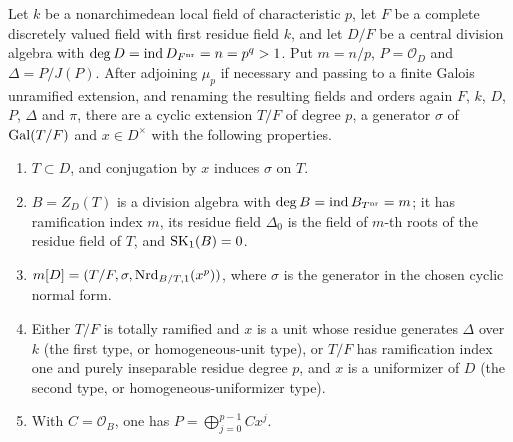 \begin{lemma}\label{lem:second-two-cyclic-cover}
Let $k$ be a nonarchimedean local field of characteristic $p$, let $F$ be a complete discretely valued field with first residue field $k$, and let $D/F$ be a central division algebra with $\deg D=\operatorname{ind} D_{F^{\mathrm{nr}}}=n=p^q>1$.
Put $m=n/p$, $P=\mathcal O_D$ and $\Delta=P/J(P)$.
After adjoining $\mu_p$ if necessary and passing to a finite Galois unramified extension, and renaming the resulting fields and orders again $F$, $k$, $D$, $P$, $\Delta$ and $\pi$, there are a cyclic extension $T/F$ of degree $p$, a generator $\sigma$ of $\operatorname{Gal}(T/F)$ and $x\in D^\times$ with the following properties.
\begin{enumerate}
\item $T\subset D$, and conjugation by $x$ induces $\sigma$ on $T$.
\item $B=Z_D(T)$ is a division algebra with $\deg B=\operatorname{ind} B_{T^{\mathrm{nr}}}=m$; it has ramification index $m$, its residue field $\Delta_0$ is the field of $m$-th roots of the residue field of $T$, and $\operatorname{SK}_1(B)=0$.
\item $m[D]=(T/F,\sigma,\operatorname{Nrd}_{B/T,1}(x^p))$, where $\sigma$ is the generator in the chosen cyclic normal form.
\item Either $T/F$ is totally ramified and $x$ is a unit whose residue generates $\Delta$ over $k$ \textup{(}the first type, or homogeneous-unit type\textup{)}, or $T/F$ has ramification index one and purely inseparable residue degree $p$, and $x$ is a uniformizer of $D$ \textup{(}the second type, or homogeneous-uniformizer type\textup{)}.
\item With $C=\mathcal O_B$, one has $P=\bigoplus_{j=0}^{p-1} Cx^j$.
\end{enumerate}
\end{lemma}

